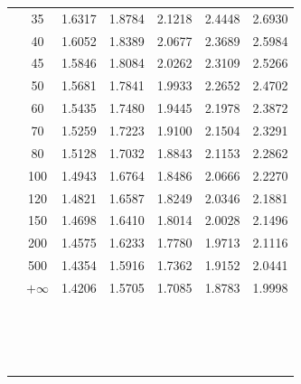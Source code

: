\begin{minipage}[t]{0.49\textwidth}
\begin{tabular}{ccccccc}
		& 35 & 1.6317 & 1.8784 & 2.1218 & 2.4448 & 2.6930 \\
		& 40 & 1.6052 & 1.8389 & 2.0677 & 2.3689 & 2.5984 \\
		& 45 & 1.5846 & 1.8084 & 2.0262 & 2.3109 & 2.5266 \\[5pt]
		& 50 & 1.5681 & 1.7841 & 1.9933 & 2.2652 & 2.4702 \\
		& 60 & 1.5435 & 1.7480 & 1.9445 & 2.1978 & 2.3872 \\
		& 70 & 1.5259 & 1.7223 & 1.9100 & 2.1504 & 2.3291 \\
		& 80 & 1.5128 & 1.7032 & 1.8843 & 2.1153 & 2.2862 \\
		& 100 & 1.4943 & 1.6764 & 1.8486 & 2.0666 & 2.2270 \\
		& 120 & 1.4821 & 1.6587 & 1.8249 & 2.0346 & 2.1881 \\
		& 150 & 1.4698 & 1.6410 & 1.8014 & 2.0028 & 2.1496 \\
		& 200 & 1.4575 & 1.6233 & 1.7780 & 1.9713 & 2.1116 \\
		& 500 & 1.4354 & 1.5916 & 1.7362 & 1.9152 & 2.0441 \\
		& $+\infty$ & 1.4206 & 1.5705 & 1.7085 & 1.8783 & 1.9998 \\
		\midrule
		&  &  &  &  &  &  \\
		&  &  &  &  &  &  \\
		&  &  &  &  &  &  \\
		&  &  &  &  &  &  \\
		&  &  &  &  &  &  \\
		&  &  &  &  &  &  \\
		&  &  &  &  &  &  \\
		&  &  &  &  &  &  \\
		&  &  &  &  &  &  \\
		&  &  &  &  &  &  \\
		&  &  &  &  &  &  \\
		&  &  &  &  &  &  \\
		&  &  &  &  &  &  \\
		&  &  &  &  &  &  \\
		&  &  &  &  &  &  \\
		&  &  &  &  &  &  \\
	\end{tabular}
\end{minipage}

